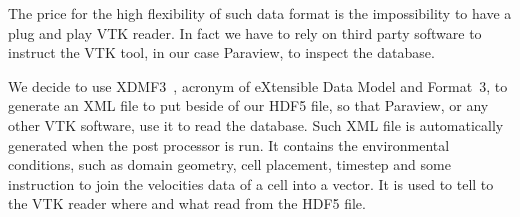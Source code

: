 The price for the high flexibility of such data format is the impossibility to have a plug and play VTK reader. In fact we have to rely on third party software to instruct the VTK tool, in our case Paraview, to inspect the database. \par
We decide to use XDMF3~\cite{xdmf3}, acronym of eXtensible Data Model and Format~3, to generate an XML file to put beside of our HDF5 file, so that Paraview, or any other VTK software, use it to read the database.
Such XML file is automatically generated when the post processor is run. It contains the environmental conditions, such as domain geometry, cell placement, timestep and some instruction to join the velocities data of a cell into a vector. It is used to tell to the VTK reader where and what read from the HDF5 file.
